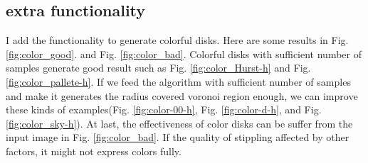 \documentclass[11pt]{article}
\begin{document}
\subsection{extra functionality}
I add the functionality to generate colorful disks. Here are some results in Fig. \ref{fig:color_good}. and Fig. \ref{fig:color_bad}. Colorful disks with sufficient number of samples generate good result such as Fig. \ref{fig:color_Hurst-h} and Fig. \ref{fig:color_pallete-h}. If we feed the algorithm with sufficient number of samples and make it generates the radius covered voronoi region enough, we can improve these kinds of examples(Fig. \ref{fig:color-00-h}, Fig. \ref{fig:color-d-h}, and Fig. \ref{fig:color_sky-h}). At last, the effectiveness of color disks can be suffer from the input image in Fig. \ref{fig:color_bad}. If the quality of stippling affected by other factors, it might not express colors fully.


\end{document}
